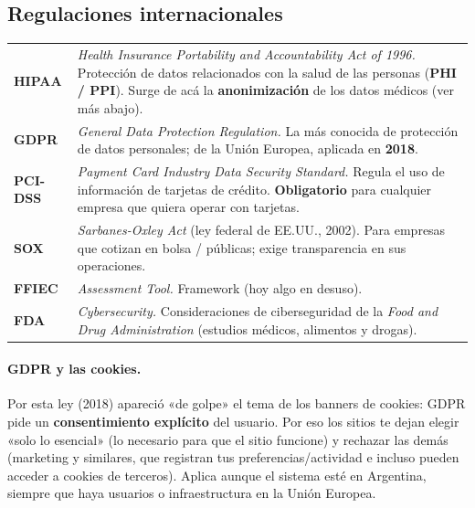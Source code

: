 \documentclass[11pt,a4paper]{article}
\begin{document}
\subsection{Regulaciones internacionales}

\begin{center}
\renewcommand{\arraystretch}{1.35}
\begin{tabular}{>{\bfseries}p{2.4cm} p{12.2cm}}
\toprule
HIPAA & \emph{Health Insurance Portability and Accountability Act of 1996.} Protección de
datos relacionados con la salud de las personas (\textbf{PHI / PPI}). Surge de acá la
\textbf{anonimización} de los datos médicos (ver más abajo). \\
GDPR & \emph{General Data Protection Regulation.} La más conocida de protección de datos
personales; de la Unión Europea, aplicada en \textbf{2018}. \\
PCI-DSS & \emph{Payment Card Industry Data Security Standard.} Regula el uso de información de
tarjetas de crédito. \textbf{Obligatorio} para cualquier empresa que quiera operar con
tarjetas. \\
SOX & \emph{Sarbanes-Oxley Act} (ley federal de EE.UU., 2002). Para empresas que cotizan en
bolsa / públicas; exige transparencia en sus operaciones. \\
FFIEC & \emph{Assessment Tool.} Framework (hoy algo en desuso). \\
FDA & \emph{Cybersecurity.} Consideraciones de ciberseguridad de la \emph{Food and Drug
Administration} (estudios médicos, alimentos y drogas). \\
\bottomrule
\end{tabular}
\end{center}

\paragraph{GDPR y las cookies.} Por esta ley (2018) apareció «de golpe» el tema de los
banners de cookies: GDPR pide un \textbf{consentimiento explícito} del usuario. Por eso los
sitios te dejan elegir «solo lo esencial» (lo necesario para que el sitio funcione) y
rechazar las demás (marketing y similares, que registran tus preferencias/actividad e incluso
pueden acceder a cookies de terceros). Aplica aunque el sistema esté en Argentina, siempre
que haya usuarios o infraestructura en la Unión Europea.
\end{document}
